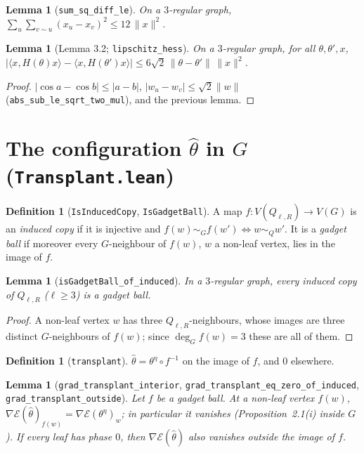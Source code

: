 \documentclass[11pt]{amsart}
\newcommand{\leanname}[1]{\texttt{\textcolor{black!75}{#1}}}
\newcommand{\lfile}[1]{\texttt{#1}}
\newcommand{\E}{\mathcal{E}}
\newcommand{\Q}{Q_{\ell,R}}
\theoremstyle{plain}
\newtheorem{lemma}[theorem]{Lemma}
\theoremstyle{definition}
\newtheorem{definition}[theorem]{Definition}
\theoremstyle{remark}
\begin{document}
\begin{lemma}[\leanname{sum\_sq\_diff\_le}]
On a $3$-regular graph, $\sum_u\sum_{v\sim u}(x_u-x_v)^2\le12\,\|x\|^2$.
\end{lemma}

\begin{lemma}[Lemma 3.2; \leanname{lipschitz\_hess}]
On a $3$-regular graph, for all $\theta,\theta',x$,
$\bigl|\langle x,H(\theta)x\rangle-\langle x,H(\theta')x\rangle\bigr|\le6\sqrt2\,\|\theta-\theta'\|\,\|x\|^2$.
\end{lemma}
\begin{proof}
$|\cos a-\cos b|\le|a-b|$, $|w_u-w_v|\le\sqrt2\|w\|$ (\leanname{abs\_sub\_le\_sqrt\_two\_mul}),
and the previous lemma.
\end{proof}

\section{The configuration $\hat\theta$ in $G$ (\lfile{Transplant.lean})}

\begin{definition}[\leanname{IsInducedCopy}, \leanname{IsGadgetBall}]
A map $f:V(\Q)\to V(G)$ is an \emph{induced copy} if it is injective and
$f(w)\sim_G f(w')\iff w\sim_Q w'$. It is a \emph{gadget ball} if moreover every $G$-neighbour of
$f(w)$, $w$ a non-leaf vertex, lies in the image of $f$.
\end{definition}

\begin{lemma}[\leanname{isGadgetBall\_of\_induced}]
In a $3$-regular graph, every induced copy of $\Q$ ($\ell\ge3$) is a gadget ball.
\end{lemma}
\begin{proof}
A non-leaf vertex $w$ has three $\Q$-neighbours, whose images are three distinct $G$-neighbours
of $f(w)$; since $\deg_G f(w)=3$ these are all of them.
\end{proof}

\begin{definition}[\leanname{transplant}]
$\hat\theta=\theta^\eta\circ f^{-1}$ on the image of $f$, and $0$ elsewhere.
\end{definition}

\begin{lemma}[\leanname{grad\_transplant\_interior}, \leanname{grad\_transplant\_eq\_zero\_of\_induced},
\leanname{grad\_transplant\_outside}]\label{lem:transplantgrad}
Let $f$ be a gadget ball. At a non-leaf vertex $f(w)$, $\nabla\E(\hat\theta)_{f(w)}=\nabla\E(\theta^\eta)_w$;
in particular it vanishes (Proposition~2.1(i) inside $G$). If every leaf has phase $0$, then
$\nabla\E(\hat\theta)$ also vanishes outside the image of $f$.
\end{lemma}
\end{document}
